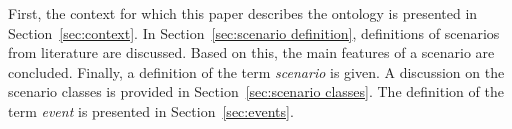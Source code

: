 First, the context for which this paper describes the ontology is presented in Section~\ref{sec:context}. In Section~\ref{sec:scenario definition}, definitions of scenarios from literature are discussed. Based on this, the main features of a scenario are concluded. Finally, a definition of the term \emph{scenario} is given. A discussion on the scenario classes is provided in Section~\ref{sec:scenario classes}. The definition of the term \emph{event} is presented in Section~\ref{sec:events}.





